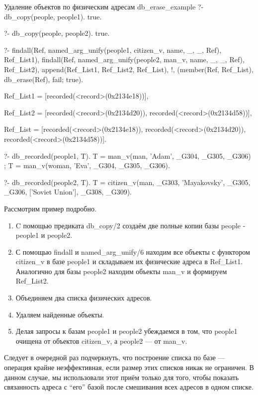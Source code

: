 \documentclass[a4paper]{book}
\begin{document}
\begin{bigexample}{Удаление объектов по физическим адресам}%
               {db_erase_example}
?- db_copy(people, people1).
true.

?- db_copy(people, people2).
true.

?- findall(Ref, 
           named_arg_unify(people1, citizen_v, name, _, _, Ref), 
           Ref_List1), 
   findall(Ref, 
           named_arg_unify(people2, man_v, name, _, _, Ref), 
           Ref_List2), 
   append(Ref_List1, Ref_List2, Ref_List), 
   !, 
   (member(Ref, Ref_List), db_erase(Ref), fail; true).

Ref_List1 = [recorded(<record>(0x2134e18))],

Ref_List2 = [recorded(<record>(0x2134d20)), 
             recorded(<record>(0x2134d58))],

Ref_List = [recorded(<record>(0x2134e18)), 
            recorded(<record>(0x2134d20)), 
            recorded(<record>(0x2134d58))].

?- db_recorded(people1, T).
T = man_v(man, 'Adam', _G304, _G305, _G306) ;
T = man_v(woman, 'Eva', _G304, _G305, _G306).

?- db_recorded(people2, T).                                        
T = citizen_v(man, _G303, 'Mayakovsky', _G305, _G306, 
              ['Soviet Union'], _G308, _G309).
\end{bigexample}

Рассмотрим пример подробно.

\begin{enumerate}
\item C помощью предиката db\_copy/2 создаём две полные копии базы
  people - people1 и people2.
\item С помощью findall и named\_arg\_unify/6 находим все объекты
  с функтором citizen\_v в базе people1 и складываем их
  физические адреса в Ref\_List1. Аналогично для базы people2
  находим объекты man\_v и формируем Ref\_List2.
\item Объединяем два списка физических адресов.
\item Удаляем найденные объекты.
\item Делая запросы к базам people1 и people2 убеждаемся в том,
  что people1 очищена от объектов citizen\_v, а people2 --- от
  man\_v.
\end{enumerate}

Следует в очередной раз подчеркнуть, что построение списка по
базе --- операция крайне неэффективная, если размер этих списков
никак не ограничен. В данном случае, мы использовали этот приём
только для того, чтобы показать связанность адреса с ``его''
базой после смешивания всех адресов в одном списке.
\end{document}
